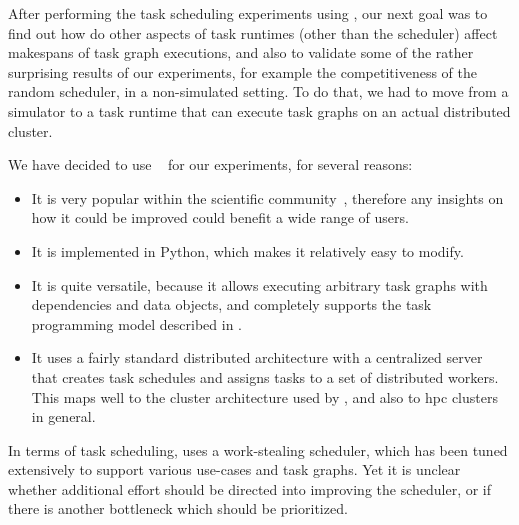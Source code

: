 After performing the task scheduling experiments using \estee{}, our next goal
was to find out how do other aspects of task runtimes (other than the scheduler) affect makespans
of task graph executions, and also to validate some of the rather surprising results of our
experiments, for example the competitiveness of the random scheduler, in a non-simulated setting.
To do that, we had to move from a simulator to a task runtime that can execute task graphs on an
actual distributed cluster.


We have decided to use \dask{}~\cite{dask} for our experiments,
for several reasons:
\begin{itemize}
	\setlength\itemsep{0.1em}
	\item It is very popular within the scientific community~\cite{dask-user-survey}, therefore any
	      insights on how it could be improved could benefit a wide range of users.
	\item It is implemented in Python, which makes it relatively easy to modify.
	\item It is quite versatile, because it allows executing arbitrary task graphs with dependencies and data
	      objects, and completely supports the task programming model described in .
	\item It uses a fairly standard distributed architecture with a centralized server that creates task
	      schedules and assigns tasks to a set of distributed workers. This maps well to the cluster
	      architecture used by \estee{}, and also to \gls{hpc} clusters in
	      general.
\end{itemize}

In terms of task scheduling, \dask{} uses a work-stealing scheduler, which has
been tuned extensively to support various use-cases and task graphs. Yet it is unclear whether
additional effort should be directed into improving the scheduler, or if there is another
bottleneck which should be prioritized.

